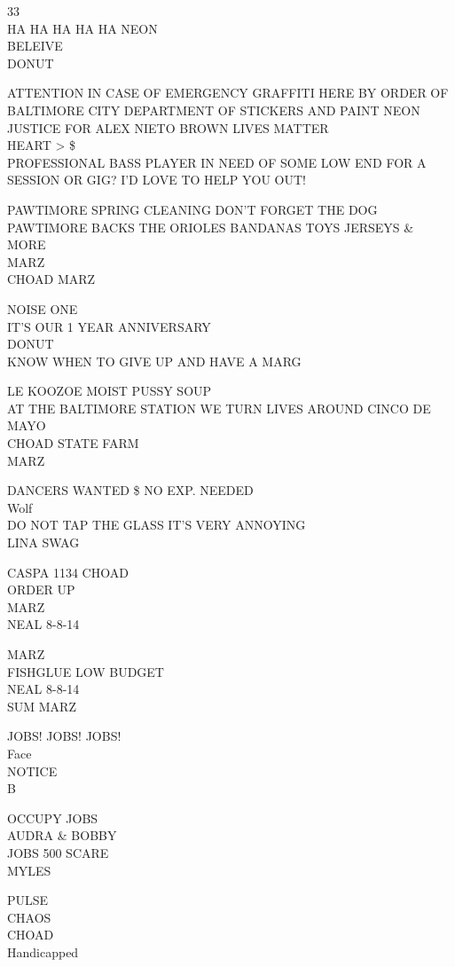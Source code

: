 \documentclass[10pt,letterpaper]{article}
\begin{document}
33\\
HA HA HA HA HA NEON\\
BELEIVE\\
DONUT

ATTENTION IN CASE OF EMERGENCY GRAFFITI HERE BY ORDER OF BALTIMORE CITY DEPARTMENT OF STICKERS AND PAINT NEON\\
JUSTICE FOR ALEX NIETO BROWN LIVES MATTER\\
HEART > \$\\
PROFESSIONAL BASS PLAYER IN NEED OF SOME LOW END FOR A SESSION OR GIG?  I'D LOVE TO HELP YOU OUT!

PAWTIMORE SPRING CLEANING DON'T FORGET THE DOG\\
PAWTIMORE BACKS THE ORIOLES BANDANAS TOYS JERSEYS \& MORE\\
MARZ\\
CHOAD MARZ

NOISE ONE\\
IT'S OUR 1 YEAR ANNIVERSARY\\
DONUT\\
KNOW WHEN TO GIVE UP AND HAVE A MARG

LE KOOZOE MOIST PUSSY SOUP\\
AT THE BALTIMORE STATION WE TURN LIVES AROUND CINCO DE MAYO\\
CHOAD STATE FARM\\
MARZ

DANCERS WANTED \$ NO EXP. NEEDED\\
Wolf\\
DO NOT TAP THE GLASS IT'S VERY ANNOYING\\
LINA SWAG

CASPA 1134 CHOAD\\
ORDER UP\\
MARZ\\
NEAL 8{-}8{-}14

MARZ\\
FISHGLUE LOW BUDGET\\
NEAL 8{-}8{-}14\\
SUM MARZ

JOBS!  JOBS!  JOBS!\\
Face\\
NOTICE\\
B

OCCUPY JOBS\\
AUDRA \& BOBBY\\
JOBS 500 SCARE\\
MYLES

PULSE\\
CHAOS\\
CHOAD\\
Handicapped
\end{document}
